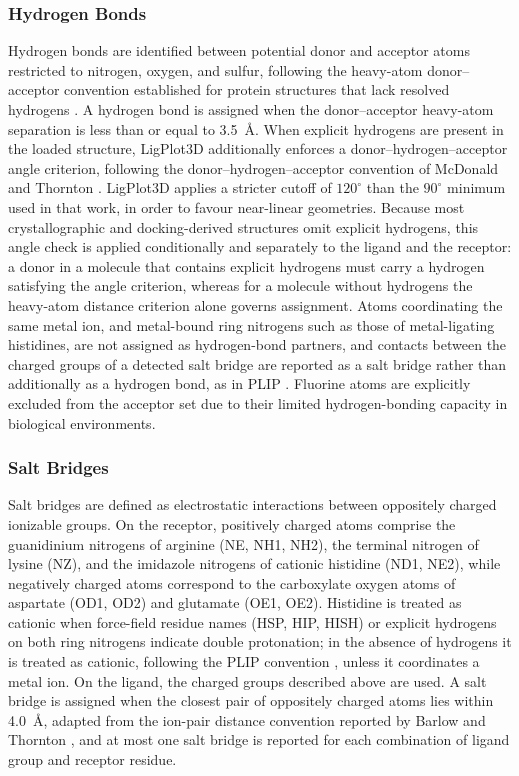 \documentclass[journal=jacsat,manuscript=article]{achemso}
\begin{document}
\subsubsection{Hydrogen Bonds}
Hydrogen bonds are identified between potential donor and acceptor atoms restricted to nitrogen, oxygen, and sulfur, following the heavy-atom donor–acceptor convention established for protein structures that lack resolved hydrogens \cite{baker1984hydrogen}. A hydrogen bond is assigned when the donor–acceptor heavy-atom separation is less than or equal to 3.5~\AA. When explicit hydrogens are present in the loaded structure, LigPlot3D additionally enforces a donor–hydrogen–acceptor angle criterion, following the donor–hydrogen–acceptor convention of McDonald and Thornton \cite{mcdonald1994satisfying}. LigPlot3D applies a stricter cutoff of $120^{\circ}$ than the $90^{\circ}$ minimum used in that work, in order to favour near-linear geometries. Because most crystallographic and docking-derived structures omit explicit hydrogens, this angle check is applied conditionally and separately to the ligand and the receptor: a donor in a molecule that contains explicit hydrogens must carry a hydrogen satisfying the angle criterion, whereas for a molecule without hydrogens the heavy-atom distance criterion alone governs assignment. Atoms coordinating the same metal ion, and metal-bound ring nitrogens such as those of metal-ligating histidines, are not assigned as hydrogen-bond partners, and contacts between the charged groups of a detected salt bridge are reported as a salt bridge rather than additionally as a hydrogen bond, as in PLIP \cite{salentin2015plip}. Fluorine atoms are explicitly excluded from the acceptor set due to their limited hydrogen-bonding capacity in biological environments.

\subsubsection{Salt Bridges}
Salt bridges are defined as electrostatic interactions between oppositely charged ionizable groups. On the receptor, positively charged atoms comprise the guanidinium nitrogens of arginine (NE, NH1, NH2), the terminal nitrogen of lysine (NZ), and the imidazole nitrogens of cationic histidine (ND1, NE2), while negatively charged atoms correspond to the carboxylate oxygen atoms of aspartate (OD1, OD2) and glutamate (OE1, OE2). Histidine is treated as cationic when force-field residue names (HSP, HIP, HISH) or explicit hydrogens on both ring nitrogens indicate double protonation; in the absence of hydrogens it is treated as cationic, following the PLIP convention \cite{salentin2015plip}, unless it coordinates a metal ion. On the ligand, the charged groups described above are used. A salt bridge is assigned when the closest pair of oppositely charged atoms lies within 4.0~\AA, adapted from the ion-pair distance convention reported by Barlow and Thornton \cite{barlow1983ion}, and at most one salt bridge is reported for each combination of ligand group and receptor residue.
\end{document}

